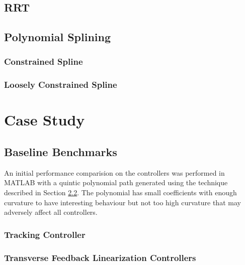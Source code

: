 \documentclass[oneside, 11pt]{book}
\begin{document}
\section{RRT}

\section{Polynomial Splining}

\subsection{Constrained Spline}

\subsection{Loosely Constrained Spline}\label{sec:restrictpolyfit}

\chapter{Case Study}

\section{Baseline Benchmarks}
An initial performance comparision on the controllers was performed in MATLAB with a quintic polynomial path generated using the technique described in Section \ref{sec:restrictpolyfit}. The polynomial has small coefficients with enough curvature to have interesting behaviour but not too high curvature that may adversely affect all controllers.

\subsection{Tracking Controller}

\subsection{Transverse Feedback Linearization Controllers}

\backmatter
\cleardoublepage
{}
{}
\printbibliography[title=References]

\cleardoublepage
{}
{}
\printindex
\end{document}
